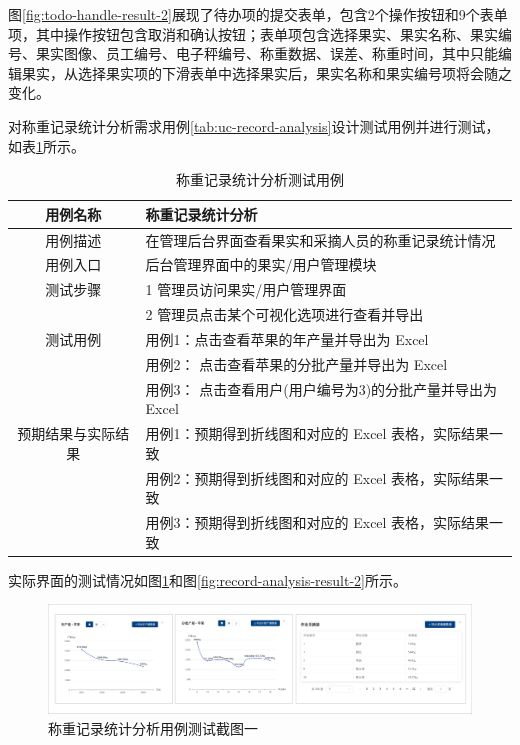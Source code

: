 图\ref{fig:todo-handle-result-2}展现了待办项的提交表单，包含2个操作按钮和9个表单项，其中操作按钮包含取消和确认按钮；表单项包含选择果实、果实名称、果实编号、果实图像、员工编号、电子秤编号、称重数据、误差、称重时间，其中只能编辑果实，从选择果实项的下滑表单中选择果实后，果实名称和果实编号项将会随之变化。

对称重记录统计分析需求用例\ref{tab:uc-record-analysis}设计测试用例并进行测试，如表\ref{tab:uc-record-analysis-test}所示。

\begin{longtable}[ht]{|c|p{8cm}|}
\caption{称重记录统计分析测试用例}
\label{tab:uc-record-analysis-test}
\\
\hline
用例名称 & 称重记录统计分析 \\
\hline
用例描述 & 在管理后台界面查看果实和采摘人员的称重记录统计情况 \\
\hline
用例入口 & 后台管理界面中的果实/用户管理模块 \\
\hline
测试步骤 & 1 管理员访问果实/用户管理界面 \\
& 2 管理员点击某个可视化选项进行查看并导出 \\
\hline
\newpage
\hline
测试用例 & 用例1：点击查看苹果的年产量并导出为 Excel \\
& 用例2： 点击查看苹果的分批产量并导出为 Excel \\
& 用例3： 点击查看用户(用户编号为3)的分批产量并导出为 Excel  \\
\hline
预期结果与实际结果 & 用例1：预期得到折线图和对应的 Excel 表格，实际结果一致 \\
& 用例2：预期得到折线图和对应的 Excel 表格，实际结果一致 \\
& 用例3：预期得到折线图和对应的 Excel 表格，实际结果一致 \\
\hline
\end{longtable}

实际界面的测试情况如图\ref{fig:record-analysis-result-1}和图\ref{fig:record-analysis-result-2}所示。

\begin{figure}[H]
    \centering
    \includegraphics[width=0.8\linewidth]{../result/record-analysis-result-1.png}
    \caption{称重记录统计分析用例测试截图一}
    \label{fig:record-analysis-result-1}
\end{figure}

